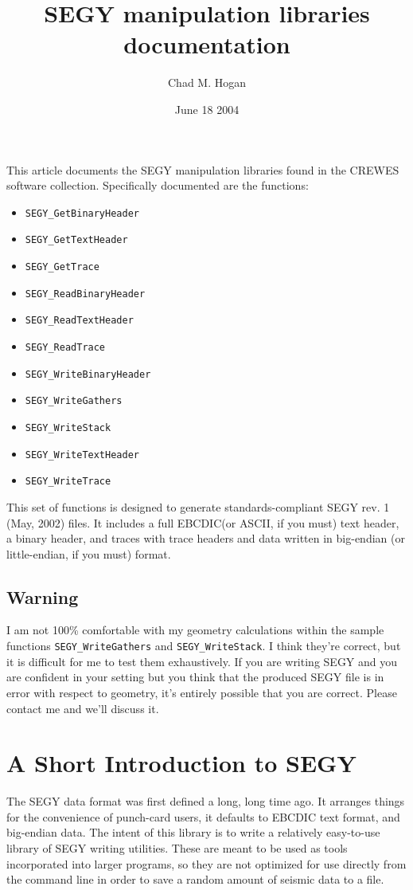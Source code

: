\documentclass[10pt]{article}
\title{SEGY manipulation libraries documentation}
\author{Chad M. Hogan}
\date{June 18 2004}
\newcommand{\segy}{{\scriptsize SEGY}\xspace}
\newcommand{\crewes}{{\scriptsize CREWES}\xspace}
\newcommand{\ascii}{{\scriptsize ASCII}\xspace}
\newcommand{\ebcdic}{{\scriptsize EBCDIC}\xspace}
\begin{document}
\maketitle

\noindent
This article documents the \segy manipulation libraries found in the
\crewes software collection. Specifically documented are the functions:
\begin{itemize}
\item {\tt SEGY\_GetBinaryHeader}
\item {\tt SEGY\_GetTextHeader}
\item {\tt SEGY\_GetTrace}
\item {\tt SEGY\_ReadBinaryHeader}
\item {\tt SEGY\_ReadTextHeader}
\item {\tt SEGY\_ReadTrace}
\item {\tt SEGY\_WriteBinaryHeader}
\item {\tt SEGY\_WriteGathers}
\item {\tt SEGY\_WriteStack}
\item {\tt SEGY\_WriteTextHeader}
\item {\tt SEGY\_WriteTrace}
\end{itemize}
This set of functions is designed to generate standards-compliant
\segy rev. 1 (May, 2002) files. It includes a full \ebcdic (or \ascii,
if you must) text header, a binary header, and traces with trace
headers and data written in big-endian (or little-endian, if you must)
format.

\subsection*{Warning}
I am not 100\% comfortable with my geometry calculations within the
sample functions {\tt SEGY\_WriteGathers} and {\tt SEGY\_WriteStack}. I
think they're correct, but it is difficult for me to test them
exhaustively. If you are writing \segy and you are confident in your
setting but you think that the produced \segy file is in error with
respect to geometry, it's entirely possible that you are correct.
Please contact me and we'll discuss it.

\section{A Short Introduction to SEGY}

The \segy data format was first defined a long, long time ago. It
arranges things for the convenience of punch-card users, it defaults
to \ebcdic text format, and big-endian data. The intent of this
library is to write a relatively easy-to-use library of \segy writing
utilities. These are meant to be used as tools incorporated into
larger programs, so they are not optimized for use directly from the
command line in order to save a random amount of seismic data to a
file. 
\end{document}
